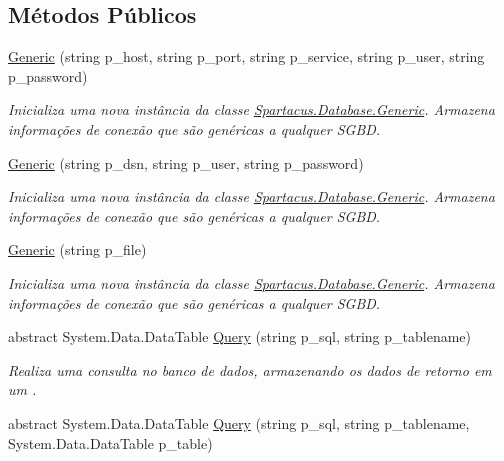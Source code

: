 \subsection*{Métodos Públicos}
\begin{DoxyCompactItemize}
\item 
\hyperlink{classSpartacus_1_1Database_1_1Generic_a622b197eddc5c95c47c848a5820addca}{Generic} (string p\+\_\+host, string p\+\_\+port, string p\+\_\+service, string p\+\_\+user, string p\+\_\+password)
\begin{DoxyCompactList}\small\item\em Inicializa uma nova instância da classe \hyperlink{classSpartacus_1_1Database_1_1Generic}{Spartacus.\+Database.\+Generic}. Armazena informações de conexão que são genéricas a qualquer S\+G\+B\+D. \end{DoxyCompactList}\item 
\hyperlink{classSpartacus_1_1Database_1_1Generic_ae767e531163e6d35c9da13bf1a26da5b}{Generic} (string p\+\_\+dsn, string p\+\_\+user, string p\+\_\+password)
\begin{DoxyCompactList}\small\item\em Inicializa uma nova instância da classe \hyperlink{classSpartacus_1_1Database_1_1Generic}{Spartacus.\+Database.\+Generic}. Armazena informações de conexão que são genéricas a qualquer S\+G\+B\+D. \end{DoxyCompactList}\item 
\hyperlink{classSpartacus_1_1Database_1_1Generic_a135fa36ed3379d3e7360a44935d3507e}{Generic} (string p\+\_\+file)
\begin{DoxyCompactList}\small\item\em Inicializa uma nova instância da classe \hyperlink{classSpartacus_1_1Database_1_1Generic}{Spartacus.\+Database.\+Generic}. Armazena informações de conexão que são genéricas a qualquer S\+G\+B\+D. \end{DoxyCompactList}\item 
abstract System.\+Data.\+Data\+Table \hyperlink{classSpartacus_1_1Database_1_1Generic_a23dc0eb8f4722d1adb1935044bc878ff}{Query} (string p\+\_\+sql, string p\+\_\+tablename)
\begin{DoxyCompactList}\small\item\em Realiza uma consulta no banco de dados, armazenando os dados de retorno em um . \end{DoxyCompactList}\item 
abstract System.\+Data.\+Data\+Table \hyperlink{classSpartacus_1_1Database_1_1Generic_a434ce0b27dfa73d909bc79c0b8471e54}{Query} (string p\+\_\+sql, string p\+\_\+tablename, System.\+Data.\+Data\+Table p\+\_\+table)

\end{DoxyCompactItemize}
